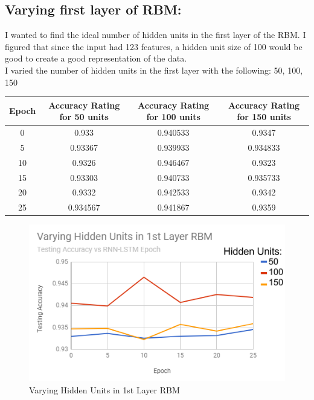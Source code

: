 \documentclass[a4paper]{article}
\begin{document}
\subsection{Varying first layer of RBM:}
\hspace*{10mm}
I wanted to find the ideal number of hidden units in the first layer of the RBM. I figured that since the input had 123 features, a hidden unit size of 100 would be good to create a good representation of the data.\\
\hspace*{10mm}
I varied the number of hidden units in the first layer with the following: 50, 100, 150
\begin{center}
 \begin{tabular}{||c c c c||} 
 \hline
Epoch&
Accuracy Rating for 50 units&
Accuracy Rating for 100 units&
Accuracy Rating for 150 units\\[0.5ex] \hline\hline
0&
0.933&
0.940533&
0.9347\\ 
 \hline
5&
0.93367&
0.939933&
0.934833\\ 
 \hline
10&
0.9326&
0.946467&
0.9323\\ 
 \hline
15&
0.93303&
0.940733&
0.935733\\ 
 \hline
20&
0.9332&
0.942533&
0.9342\\ 
 \hline
25&
0.934567&
0.941867&
0.9359\\ 
 \hline
\end{tabular}
\begin{figure}[h]
\centering
\includegraphics{varyRBM1st}\caption{Varying Hidden Units in 1st Layer RBM}\label{fig:XSS}
\end{figure}
\end{center}
\pagebreak
\end{document}
